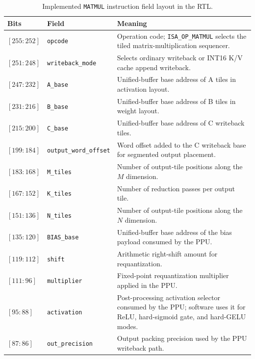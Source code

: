 \documentclass[a4paper, 12pt, titlepage]{article}
\begin{document}
\begin{table}[H]
    \centering
    \footnotesize
\caption{Implemented \texttt{MATMUL} instruction field layout in the RTL.}
    \label{tab:matmul-isa}
    \begin{tabularx}{\textwidth}{|l|l|Y|}
        \hline
        \textbf{Bits} & \textbf{Field} & \textbf{Meaning} \\
        \hline
        $[255:252]$ & \texttt{opcode} & Operation code; \texttt{ISA\_OP\_MATMUL} selects the tiled matrix-multiplication sequencer. \\
        \hline
        $[251:248]$ & \texttt{writeback\_mode} & Selects ordinary writeback or INT16 K/V cache append writeback. \\
        \hline
        $[247:232]$ & \texttt{A\_base} & Unified-buffer base address of A tiles in activation layout. \\
        \hline
        $[231:216]$ & \texttt{B\_base} & Unified-buffer base address of B tiles in weight layout. \\
        \hline
        $[215:200]$ & \texttt{C\_base} & Unified-buffer base address of C writeback tiles. \\
        \hline
        $[199:184]$ & \texttt{output\_word\_offset} & Word offset added to the C writeback base for segmented output placement. \\
        \hline
        $[183:168]$ & \texttt{M\_tiles} & Number of output-tile positions along the $M$ dimension. \\
        \hline
        $[167:152]$ & \texttt{K\_tiles} & Number of reduction passes per output tile. \\
        \hline
        $[151:136]$ & \texttt{N\_tiles} & Number of output-tile positions along the $N$ dimension. \\
        \hline
        $[135:120]$ & \texttt{BIAS\_base} & Unified-buffer base address of the bias payload consumed by the PPU. \\
        \hline
        $[119:112]$ & \texttt{shift} & Arithmetic right-shift amount for requantization. \\
        \hline
        $[111:96]$ & \texttt{multiplier} & Fixed-point requantization multiplier applied in the PPU. \\
        \hline
        $[95:88]$ & \texttt{activation} & Post-processing activation selector consumed by the PPU; software uses it for ReLU, hard-sigmoid gate, and hard-GELU modes. \\
        \hline
        $[87:86]$ & \texttt{out\_precision} & Output packing precision used by the PPU writeback path. \\

\end{tabularx}
\end{table}
\end{document}

